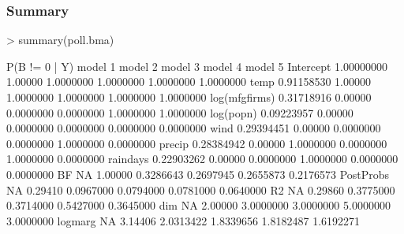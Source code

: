 \documentclass[]{beamer}
\begin{document}
\begin{frame}[fragile]\frametitle{Summary}

\begin{small}
\begin{Schunk}
\begin{Sinput}
> summary(poll.bma)
\end{Sinput}
\begin{Soutput}
              P(B != 0 | Y) model 1   model 2   model 3   model 4   model 5
Intercept        1.00000000 1.00000 1.0000000 1.0000000 1.0000000 1.0000000
temp             0.91158530 1.00000 1.0000000 1.0000000 1.0000000 1.0000000
log(mfgfirms)    0.31718916 0.00000 0.0000000 0.0000000 1.0000000 1.0000000
log(popn)        0.09223957 0.00000 0.0000000 0.0000000 0.0000000 0.0000000
wind             0.29394451 0.00000 0.0000000 0.0000000 1.0000000 0.0000000
precip           0.28384942 0.00000 1.0000000 0.0000000 1.0000000 0.0000000
raindays         0.22903262 0.00000 0.0000000 1.0000000 0.0000000 0.0000000
BF                       NA 1.00000 0.3286643 0.2697945 0.2655873 0.2176573
PostProbs                NA 0.29410 0.0967000 0.0794000 0.0781000 0.0640000
R2                       NA 0.29860 0.3775000 0.3714000 0.5427000 0.3645000
dim                      NA 2.00000 3.0000000 3.0000000 5.0000000 3.0000000
logmarg                  NA 3.14406 2.0313422 1.8339656 1.8182487 1.6192271
\end{Soutput}
\end{Schunk}
\end{small}

\end{frame}
\end{document}
